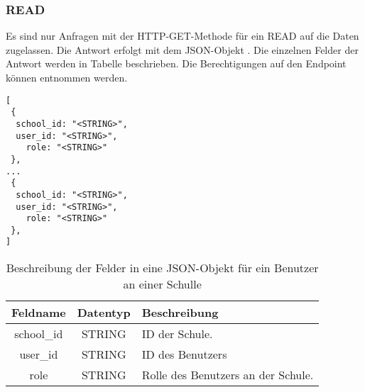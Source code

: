\subsubsection{READ}
\label{sec:end:rest:api:school:users:read}
Es sind nur Anfragen mit der HTTP-GET-Methode für ein READ auf die Daten zugelassen.
Die Antwort erfolgt mit dem JSON-Objekt . Die einzelnen Felder der Antwort werden in Tabelle  beschrieben.
Die Berechtigungen auf den Endpoint können  entnommen werden.

\begin{lstlisting}[caption={JSON-Antwort für einen GET-Aufruf der Route /api/school/users},label={lst:code:end:rest:api:school:users:read:ret},frame=tlrb]
[
 {
  school_id: "<STRING>",
  user_id: "<STRING>",
	role: "<STRING>"
 },
...
 {
  school_id: "<STRING>",
  user_id: "<STRING>",
	role: "<STRING>"
 },
]
\end{lstlisting}

\begin{table}[htb]
	\begin{tabularx}{\textwidth}{|c|c|X|}
		\hline
			\textbf{Feldname} & \textbf{Datentyp} & \textbf{Beschreibung} \\ \hline
			school\_id & STRING & ID der Schule. \\ \hline
			user\_id & STRING & ID des Benutzers \\ \hline
			role & STRING & Rolle des Benutzers an der Schule. \\ \hline
	\end{tabularx}

		\caption{Beschreibung der Felder in eine JSON-Objekt für ein Benutzer an einer Schulle}
		\label{tab:end:rest:api:school:users:read:ret:json}
\end{table}

